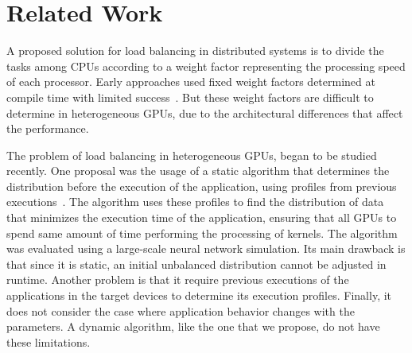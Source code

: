 \documentclass[journal]{IEEEtran}
\begin{document}

\section{Related Work}

A proposed solution for load balancing in distributed systems is to divide the
tasks among CPUs according to a weight factor representing the processing speed
of each processor. Early approaches used fixed weight factors determined at
compile time with limited success~\cite{Hummel}. But these weight factors are
difficult to determine in heterogeneous GPUs, due to the architectural
differences that affect the performance.

The problem of load balancing in heterogeneous GPUs, began to be studied
recently. One proposal was the usage of a static algorithm that determines the
distribution before the execution of the application, using profiles from
previous executions~\cite{raphael}. The algorithm uses these profiles to find
the distribution of data that minimizes the execution time of the application,
ensuring that all GPUs to spend same amount of time performing the processing of
kernels. The algorithm was evaluated using a large-scale neural network
simulation. Its main drawback is that since it is static, an initial unbalanced
distribution cannot be adjusted in runtime. Another problem is that it require
previous executions of the applications in the target devices to determine its
execution profiles. Finally, it does not consider the case where application
behavior changes with the parameters. A dynamic algorithm, like the one that we
propose, do not have these limitations.
\end{document}
